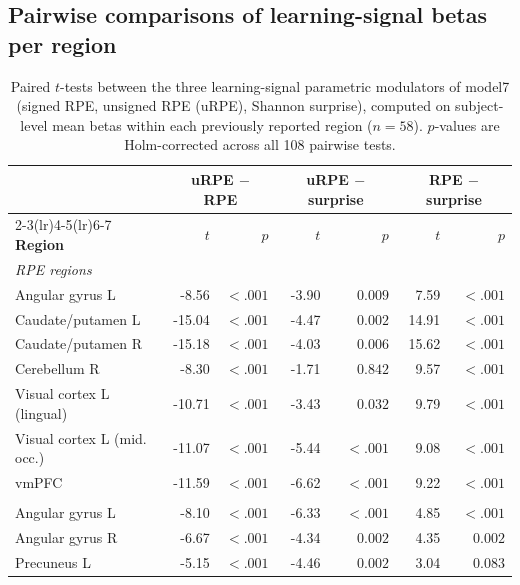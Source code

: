 \subsection{\rev Pairwise comparisons of learning-signal betas per region}

\begin{table}[htbp]
    \centering
    \rev
    \begin{threeparttable}
    \caption{Paired $t$-tests between the three learning-signal parametric
    modulators of model7 (signed RPE, unsigned RPE (uRPE), Shannon surprise),
    computed on subject-level mean betas within each previously reported
    region ($n=58$). $p$-values are Holm-corrected across all
    108 pairwise tests.}
    \label{tab:roi_signal_ttests}
    \begin{tabularx}{\textwidth}{X rr rr rr}
        \toprule
        & \multicolumn{2}{c}{uRPE $-$ RPE} & \multicolumn{2}{c}{uRPE $-$ surprise} & \multicolumn{2}{c}{RPE $-$ surprise} \\
        \cmidrule(lr){2-3}\cmidrule(lr){4-5}\cmidrule(lr){6-7}
        \textbf{Region} & $t$ & $p$ & $t$ & $p$ & $t$ & $p$ \\
        \midrule
        \multicolumn{7}{l}{\textit{RPE regions}} \\
        Angular gyrus L & -8.56 & $<.001$ & -3.90 & $0.009$ & 7.59 & $<.001$ \\
        Caudate/putamen L & -15.04 & $<.001$ & -4.47 & $0.002$ & 14.91 & $<.001$ \\
        Caudate/putamen R & -15.18 & $<.001$ & -4.03 & $0.006$ & 15.62 & $<.001$ \\
        Cerebellum R & -8.30 & $<.001$ & -1.71 & $0.842$ & 9.57 & $<.001$ \\
        Visual cortex L (lingual) & -10.71 & $<.001$ & -3.43 & $0.032$ & 9.79 & $<.001$ \\
        Visual cortex L (mid. occ.) & -11.07 & $<.001$ & -5.44 & $<.001$ & 9.08 & $<.001$ \\
        vmPFC & -11.59 & $<.001$ & -6.62 & $<.001$ & 9.22 & $<.001$ \\
        \addlinespace
        \multicolumn{7}{l}{\textit{Surprise regions}} \\
        Angular gyrus L & -8.10 & $<.001$ & -6.33 & $<.001$ & 4.85 & $<.001$ \\
        Angular gyrus R & -6.67 & $<.001$ & -4.34 & $0.002$ & 4.35 & $0.002$ \\
        Precuneus L & -5.15 & $<.001$ & -4.46 & $0.002$ & 3.04 & $0.083$ \\

\end{tabularx}
\end{threeparttable}
\end{table}
